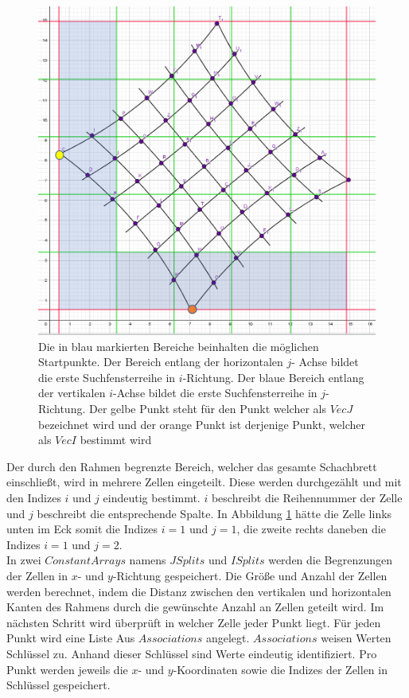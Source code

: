 \begin{figure}[!htb]
	\centering
	\includegraphics[width=0.6\linewidth]{images/VerzeichnetesSchachbrett_1.png}
	\caption[Startpunktsuche in Schachbrettpunkten]{Die in blau markierten Bereiche beinhalten die möglichen Startpunkte. Der Bereich entlang der horizontalen $j$- Achse bildet die erste Suchfensterreihe in $i$-Richtung. Der blaue Bereich entlang der vertikalen $i$-Achse bildet die erste Suchfensterreihe in $j$-Richtung. Der gelbe Punkt steht für den Punkt welcher als $VecJ$ bezeichnet wird und der orange Punkt ist derjenige Punkt, welcher als $VecI$ bestimmt wird}
	\label{fig:7.1}
\end{figure}

Der durch den Rahmen begrenzte Bereich, welcher das gesamte Schachbrett einschließt, wird in mehrere Zellen eingeteilt. Diese werden durchgezählt und mit den Indizes $i$ und $j$ eindeutig bestimmt. $i$ beschreibt die Reihennummer der Zelle und $j$ beschreibt die entsprechende Spalte. In Abbildung \ref{fig:7.1} hätte die Zelle links unten im Eck somit die Indizes $i = 1$ und $j = 1$, die zweite rechts daneben die Indizes $i = 1$ und $j= 2$.\\

In zwei $ConstantArrays$ namens $JSplits$ und $ISplits$ werden die Begrenzungen der Zellen  in $x$- und $y$-Richtung gespeichert. Die Größe und Anzahl der Zellen werden berechnet, indem die Distanz zwischen den vertikalen und horizontalen Kanten des Rahmens durch die gewünschte Anzahl an Zellen geteilt wird. Im nächsten Schritt wird überprüft in welcher Zelle jeder Punkt liegt. Für jeden Punkt wird eine Liste Aus $Associations$ angelegt.  $Associations$ weisen Werten Schlüssel zu. Anhand dieser Schlüssel sind Werte eindeutig identifiziert\cite{Mathematica}. Pro Punkt werden jeweils die $x$- und $y$-Koordinaten sowie die Indizes der Zellen in Schlüssel gespeichert.

